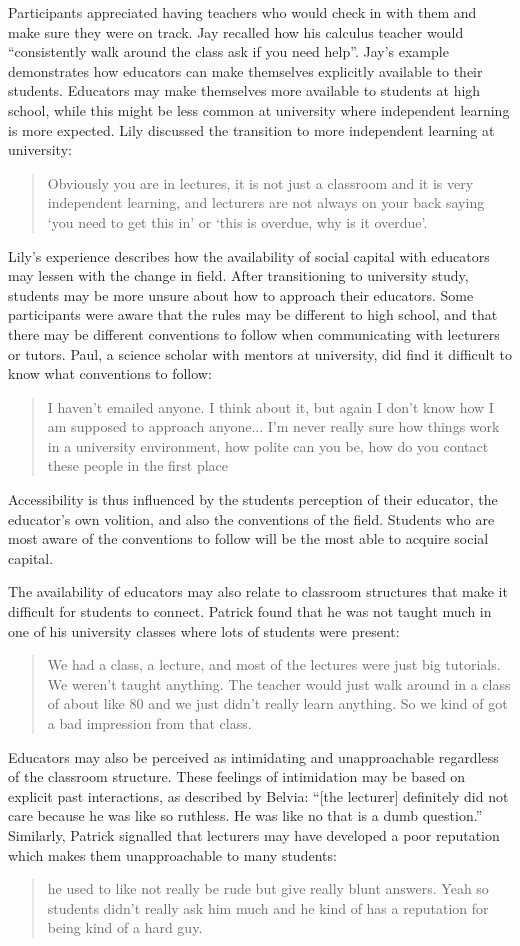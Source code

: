 Participants appreciated having teachers who would check in with them and make sure they were on track. Jay recalled how his calculus teacher would ``consistently walk around the class ask if you need help''. Jay's example demonstrates how educators can make themselves explicitly available to their students. Educators may make themselves more available to students at high school, while this might be less common at university where independent learning is more expected. Lily discussed the transition to more independent learning at university: \blockquote{Obviously you are in lectures, it is not just a classroom and it is very independent learning, and lecturers are not always on your back saying `you need to get this in' or `this is overdue, why is it overdue'.
} Lily's experience describes how the availability of social capital with educators may lessen with the change in field. After transitioning to university study, students may be more unsure about how to approach their educators. Some participants were aware that the rules may be different to high school, and that there may be different conventions to follow when communicating with lecturers or tutors. Paul, a science scholar with mentors at university, did find it difficult to know what conventions to follow:
\blockquote{I haven't emailed anyone. I think about it, but again I don't know how I am supposed to approach anyone... I'm never really sure how things work in a university environment, how polite can you be, how do you contact these people in the first place}. Accessibility is thus influenced by the students perception of their educator, the educator's own volition, and also the conventions of the field. Students who are most aware of the conventions to follow will be the most able to acquire social capital. 

The availability of educators may also relate to classroom structures that make it difficult for students to connect. Patrick found that he was not taught much in one of his university classes where lots of students were present: \blockquote{We had a class, a lecture, and most of the lectures were just big tutorials. We weren't taught anything. The teacher would just walk around in a class of about like 80 and we just didn't really learn anything. So we kind of got a bad impression from that class.} 

Educators may also be perceived as intimidating and unapproachable regardless of the classroom structure. These feelings of intimidation may be based on explicit past interactions, as described by Belvia: ``[the lecturer] definitely did not care because he was like so ruthless. He was like no that is a dumb question.'' Similarly, Patrick signalled that lecturers may have developed a poor reputation which makes them unapproachable to many students: \blockquote{he used to like not really be rude but give really blunt answers. Yeah so students didn't really ask him much and he kind of has a reputation for being kind of a hard guy.} 

